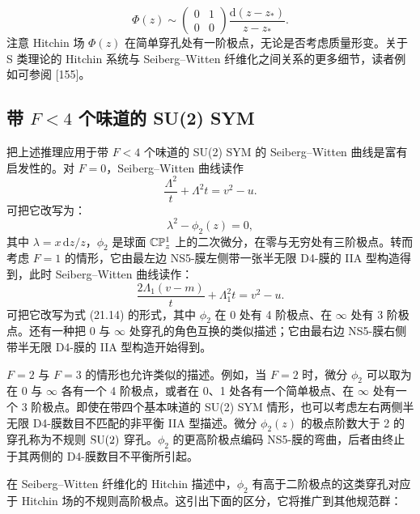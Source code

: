 \[
\Phi(z)\sim\begin{pmatrix}0&1\\0&0\end{pmatrix}\frac{\mathrm{d}(z-z_*)}{z-z_*}.
\]
注意 Hitchin 场 $\Phi(z)$ 在简单穿孔处有一阶极点，无论是否考虑质量形变。关于 S 类理论的 Hitchin 系统与 Seiberg–Witten 纤维化之间关系的更多细节，读者例如可参阅 [155]。

\subsection{带 $F<4$ 个味道的 SU(2) SYM}

把上述推理应用于带 $F<4$ 个味道的 SU(2) SYM 的 Seiberg–Witten 曲线是富有启发性的。对 $F=0$，Seiberg–Witten 曲线读作
\[
\frac{\Lambda^2}{t}+\Lambda^2t=v^2-u.
\]
可把它改写为：
\begin{equation}
\lambda^2-\phi_2(z)=0,
\tag{21.14}
\end{equation}
其中 $\lambda=x\,\mathrm{d}z/z$，$\phi_2$ 是球面 $\mathbb{C}\mathbb{P}^1_z$ 上的二次微分，在零与无穷处有三阶极点。转而考虑 $F=1$ 的情形，它由最左边 NS5-膜左侧带一张半无限 D4-膜的 IIA 型构造得到，此时 Seiberg–Witten 曲线读作：
\[
\frac{2\Lambda_1(v-m)}{t}+\Lambda_1^2t=v^2-u.
\]
可把它改写为式 (21.14) 的形式，其中 $\phi_2$ 在 0 处有 4 阶极点、在 $\infty$ 处有 3 阶极点。还有一种把 0 与 $\infty$ 处穿孔的角色互换的类似描述；它由最右边 NS5-膜右侧带半无限 D4-膜的 IIA 型构造开始得到。

$F=2$ 与 $F=3$ 的情形也允许类似的描述。例如，当 $F=2$ 时，微分 $\phi_2$ 可以取为在 0 与 $\infty$ 各有一个 4 阶极点，或者在 0、1 处各有一个简单极点、在 $\infty$ 处有一个 3 阶极点。即使在带四个基本味道的 SU(2) SYM 情形，也可以考虑左右两侧半无限 D4-膜数目不匹配的非平衡 IIA 型描述。微分 $\phi_2(z)$ 的极点阶数大于 2 的穿孔称为不规则 $\operatorname{SU}(2)$ 穿孔。$\phi_2$ 的更高阶极点编码 NS5-膜的弯曲，后者由终止于其两侧的 D4-膜数目不平衡所引起。

在 Seiberg–Witten 纤维化的 Hitchin 描述中，$\phi_2$ 有高于二阶极点的这类穿孔对应于 Hitchin 场的不规则高阶极点。这引出下面的区分，它将推广到其他规范群：
